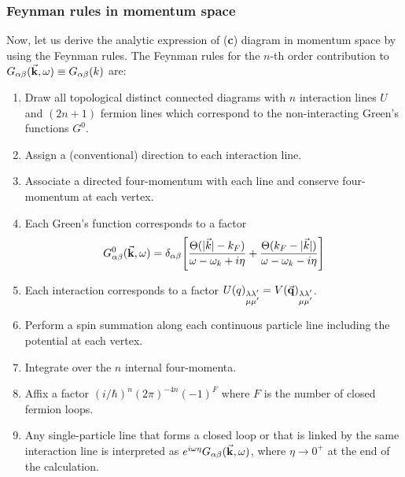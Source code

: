 \documentclass[11pt, a4paper, twoside, openright]{article}
\begin{document}
\subsubsection*{Feynman rules in momentum space}
Now, let us derive the analytic expression of (\textbf{c}) diagram in momentum space by using the Feynman rules.
The Feynman rules for the \( n \)-th order contribution to \( G_{\alpha \beta } (\va{k}, \omega ) \equiv G_{\alpha \beta } (k) \) are:
\begin{enumerate}
\item Draw all topological distinct connected diagrams with \( n \) interaction lines \( U \) and \( (2n+1) \) fermion lines which correspond to the non-interacting Green's functions \( G^0 \).
\item Assign a (conventional) direction to each interaction line.
\item Associate a directed four-momentum with each line and conserve four-momentum at each vertex.
\item Each Green's function corresponds to a factor
\begin{equation*}
  G^0_{\alpha \beta } (\va{k}, \omega ) = \delta _{\alpha \beta } \qty[ \frac{\Theta (| \vec{k} | - k_F )}{\omega - \omega _k + i \eta }
  + \frac{\Theta ( k_F - | \vec{k} | )}{\omega - \omega _k - i \eta }]
\end{equation*}
\item Each interaction corresponds to a factor \( U(q)_{\substack{\lambda \lambda' \\ \mu \mu'} } = V(\va{q})_{\substack{\lambda \lambda' \\ \mu \mu'} } \).
\item Perform a spin summation along each continuous particle line including the potential at each vertex.
\item Integrate over the \( n \) internal four-momenta.
\item Affix a factor \( (i/\hbar )^n (2 \pi )^{-4n} (-1)^F \) where \( F \) is the number of closed fermion loops.
\item Any single-particle line that forms a closed loop or that is linked by the same interaction line is interpreted as \( e^{i \omega \eta } G_{\alpha \beta } (\va{k}, \omega )  \), where \( \eta \rightarrow 0^+ \) at the end of the calculation.
\end{enumerate}
\end{document}
